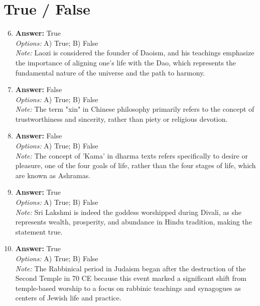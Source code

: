 \documentclass[12pt]{article}
\begin{document}
\section*{True / False}
\begin{enumerate}[label=\arabic*.]
\setcounter{enumi}{5}
\item \textbf{Answer:} True
\\ \textit{Options:} A) True; B) False
\\ \textit{Note:} Laozi is considered the founder of Daoism, and his teachings emphasize the importance of aligning one's life with the Dao, which represents the fundamental nature of the universe and the path to harmony.
\item \textbf{Answer:} False
\\ \textit{Options:} A) True; B) False
\\ \textit{Note:} The term "xin" in Chinese philosophy primarily refers to the concept of trustworthiness and sincerity, rather than piety or religious devotion.
\item \textbf{Answer:} False
\\ \textit{Options:} A) True; B) False
\\ \textit{Note:} The concept of 'Kama' in dharma texts refers specifically to desire or pleasure, one of the four goals of life, rather than the four stages of life, which are known as Ashramas.
\item \textbf{Answer:} True
\\ \textit{Options:} A) True; B) False
\\ \textit{Note:} Sri Lakshmi is indeed the goddess worshipped during Divali, as she represents wealth, prosperity, and abundance in Hindu tradition, making the statement true.
\item \textbf{Answer:} True
\\ \textit{Options:} A) True; B) False
\\ \textit{Note:} The Rabbinical period in Judaism began after the destruction of the Second Temple in 70 CE because this event marked a significant shift from temple-based worship to a focus on rabbinic teachings and synagogues as centers of Jewish life and practice.
\end{enumerate}
\end{document}
